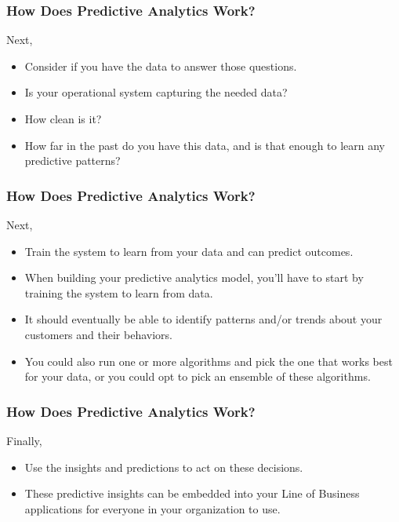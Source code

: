 \begin{frame}\frametitle{How Does Predictive Analytics Work?}
Next, 
\begin{itemize}
\item Consider if you have the data to answer those questions. 
\item Is your operational system capturing the needed data? 
\item How clean is it? 
\item How far in the past do you have this data, and is that enough to learn any predictive patterns?
\end{itemize}

\end{frame}

\begin{frame}\frametitle{How Does Predictive Analytics Work?}
Next, 
\begin{itemize}
\item Train the system to learn from your data and can predict outcomes. 
\item When building your predictive analytics model, you’ll have to start by training the system to learn from data. 
\item It should eventually be able to identify patterns and/or trends about your customers and their behaviors. 
\item You could also run one or more algorithms and pick the one that works best for your data, or you could opt to pick an ensemble of these algorithms.
\end{itemize}

\end{frame}

\begin{frame}\frametitle{How Does Predictive Analytics Work?}
Finally, 
\begin{itemize}
\item Use the insights and predictions to act on these decisions.
\item These predictive insights can be embedded into your Line of Business applications for everyone in your organization to use.
\end{itemize}

\end{frame}

